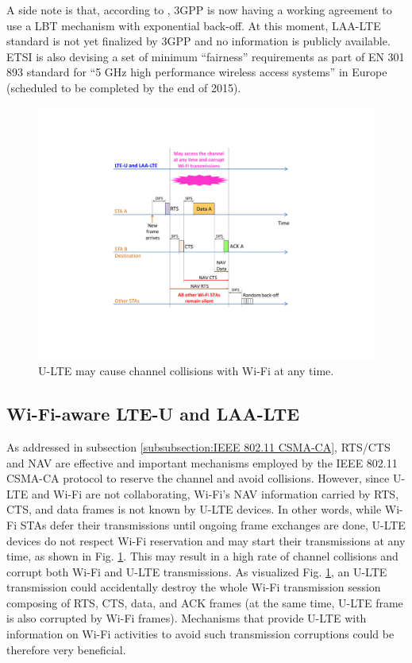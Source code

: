 \documentclass[12pt,onecolumn]{article}
\begin{document}
A side note is that, according to \cite{U-LTE-FCC-Cisco-2015}, 3GPP is now having a working agreement to use a LBT mechanism with exponential back-off. At this moment, LAA-LTE standard is not yet finalized by 3GPP and no information is publicly available. ETSI is also devising a set of minimum ``fairness'' requirements as part of EN 301 893 standard for ``5 GHz high performance wireless access systems'' in Europe (scheduled to be completed by the end of 2015).

\begin{figure}[!t]
\centering
\includegraphics[width=0.7\columnwidth]{figures2/LTE-U-enhancement-RTS-CTS-NAV}
\caption{U-LTE may cause channel collisions with Wi-Fi at any time.}
\label{figs:LTE-U-enhancement-RTS-CTS-NAV}
\end{figure}

\subsection{Wi-Fi-aware LTE-U and LAA-LTE}
\label{subsection:Wi-Fi-aware}

As addressed in subsection \ref{subsubsection:IEEE 802.11 CSMA-CA}, RTS/CTS and NAV are effective and important mechanisms employed by the IEEE 802.11 CSMA-CA protocol to reserve the channel and avoid collisions. However, since U-LTE and Wi-Fi are not collaborating, Wi-Fi's NAV information carried by RTS, CTS, and data frames is not known by U-LTE devices. In other words, while Wi-Fi STAs defer their transmissions until ongoing frame exchanges are done, U-LTE devices do not respect Wi-Fi reservation and may start their transmissions at any time, as shown in Fig. \ref{figs:LTE-U-enhancement-RTS-CTS-NAV}. This may result in a high rate of channel collisions and corrupt both Wi-Fi and U-LTE transmissions. As visualized Fig. \ref{figs:LTE-U-enhancement-RTS-CTS-NAV}, an U-LTE transmission could accidentally destroy the whole Wi-Fi transmission session composing of RTS, CTS, data, and ACK frames (at the same time, U-LTE frame is also corrupted by Wi-Fi frames). Mechanisms that provide U-LTE with information on Wi-Fi activities to avoid such transmission corruptions could be therefore very beneficial.
\end{document}
